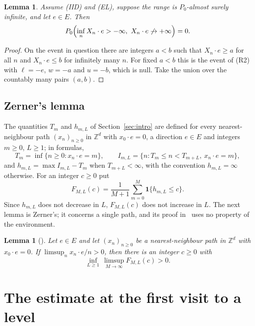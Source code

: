\documentclass[11pt]{amsart}
\newtheorem{lemma}[theorem]{Lemma}
\theoremstyle{remark}
\newcommand{\Z}{\mathbb{Z}}
\begin{document}
\begin{lemma}\label{lem:onesidedpaths}
Assume (IID) and (EL), suppose the range is $P_0$-almost surely infinite, and let $e\in E$. Then
\[
P_0\Bigl(\inf_n X_n\cdot e>-\infty,\ X_n\cdot e\not\to+\infty\Bigr)=0 .
\]
\end{lemma}

\begin{proof}
On the event in question there are integers $a<b$ such that $X_n\cdot e\ge a$ for all $n$ and $X_n\cdot e\le b$ for
infinitely many $n$. For fixed $a<b$ this is the event of (R2) with $\ell=-e$, $w=-a$ and $u=-b$, which is null. Take the
union over the countably many pairs $(a,b)$.
\end{proof}

\subsection{Zerner's lemma}
The quantities $T_m$ and $h_{m,L}$ of Section~\ref{sec:intro} are defined for every nearest-neighbour path
$(x_n)_{n\ge0}$ in $\Z^d$ with $x_0\cdot e=0$, a direction $e\in E$ and integers $m\ge0$, $L\ge1$; in formulas,
\[
T_m=\inf\{n\ge0:x_n\cdot e=m\},\qquad I_{m,L}=\{n:T_m\le n<T_{m+L},\ x_n\cdot e=m\},
\]
and $h_{m,L}=\max I_{m,L}-T_m$ when $T_{m+L}<\infty$, with the convention $h_{m,L}=\infty$ otherwise. For an integer
$c\ge0$ put
\[
F_{M,L}(c)=\frac1{M+1}\sum_{m=0}^{M}\mathbf 1\{h_{m,L}\le c\}.
\]
Since $h_{m,L}$ does not decrease in $L$, $F_{M,L}(c)$ does not increase in $L$. The next lemma is Zerner's; it
concerns a single path, and its proof in~\cite{Zer02} uses no property of the environment.

\begin{lemma}[{\cite[Lemma 3]{Zer02}}]\label{lem:counting}
Let $e\in E$ and let $(x_n)_{n\ge0}$ be a nearest-neighbour path in $\Z^d$ with $x_0\cdot e=0$. If
$\limsup_n x_n\cdot e/n>0$, then there is an integer $c\ge0$ with
\[
\inf_{L\ge1}\,\limsup_{M\to\infty}F_{M,L}(c)>0 .
\]
\end{lemma}

\section{The estimate at the first visit to a level}\label{sec:fresh}
\end{document}
